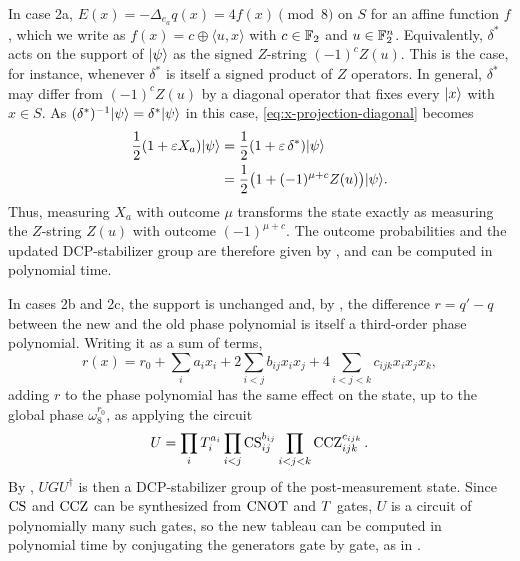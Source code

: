 In case 2a, $E(x) = -\Delta_{e_a} q(x) = 4f(x) \pmod 8$ on $S$ for an affine function $f$, which we write as $f(x) = c \oplus \langle u, x \rangle$ with $c \in \mathbb{F}_2$ and $u \in \mathbb{F}_2^n$.
Equivalently, $\delta^*$ acts on the support of $|\psi\rangle$ as the signed $Z$-string $(-1)^c Z(u)$.
This is the case, for instance, whenever $\delta^*$ is itself a signed product of $Z$ operators.
In general, $\delta^*$ may differ from $(-1)^c Z(u)$ by a diagonal operator that fixes every $|x\rangle$ with $x \in S$. As $(\delta^*)^{-1}|\psi\rangle = \delta^*|\psi\rangle$ in this case, \cref{eq:x-projection-diagonal} becomes
\begin{align}
    \frac{1}{2}(1 + \varepsilon X_a) |\psi\rangle
    &= \frac{1}{2}(1 + \varepsilon\, \delta^*) |\psi\rangle \\
    &= \frac{1}{2}\big(1 + (-1)^{\mu + c} Z(u)\big) |\psi\rangle.
\end{align}
Thus, measuring $X_a$ with outcome $\mu$ transforms the state exactly as measuring the $Z$-string $Z(u)$ with outcome $(-1)^{\mu + c}$. The outcome probabilities and the updated DCP-stabilizer group are therefore given by , and can be computed in polynomial time.

In cases 2b and 2c, the support is unchanged and, by , the difference $r = q' - q$ between the new and the old phase polynomial is itself a third-order phase polynomial. Writing it as a sum of terms,
\[
    r(x) = r_0 + \sum_i a_i x_i + 2\sum_{i<j} b_{ij} x_i x_j + 4\sum_{i<j<k} c_{ijk} x_i x_j x_k,
\]
adding $r$ to the phase polynomial has the same effect on the state, up to the global phase $\omega_8^{r_0}$, as applying the circuit
\[
    U =
    \prod_i T_i^{a_i}
    \prod_{i<j} \operatorname{CS}_{ij}^{b_{ij}}
    \prod_{i<j<k} \operatorname{CCZ}_{ijk}^{c_{ijk}}.
\]
By , $U G U^\dagger$ is then a DCP-stabilizer group of the post-measurement state. Since $\operatorname{CS}$ and $\operatorname{CCZ}$ can be synthesized from $\operatorname{CNOT}$ and $T$ gates, $U$ is a circuit of polynomially many such gates, so the new tableau can be computed in polynomial time by conjugating the generators gate by gate, as in .
